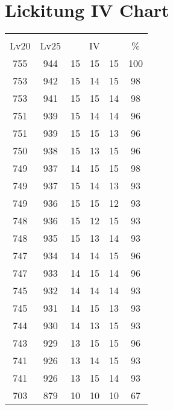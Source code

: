 \documentclass{article}%
\begin{document}
%
\normalsize%
\section{Lickitung IV Chart}%
\label{sec:Lickitung IV Chart}%
\renewcommand{\arraystretch}{1.5}%
\begin{tabular}{|c|c|c|c|c|c|}%
\hline%
\multicolumn{6}{|c|}{\textcolor{white}{ 
\linebreak{Lickitung}
}%
\cellcolor{black}}\\%
\multicolumn{1}{|c}{Lv20}&\multicolumn{1}{c|}{Lv25}&\multicolumn{3}{c|}{IV}&\multicolumn{1}{|c|}{\%}\\%
\hline%
\rowcolor{color100}%
755&944&15&15&15&100\\%
\hline%
\rowcolor{color98}%
753&942&15&14&15&98\\%
\hline%
\rowcolor{color98}%
753&941&15&15&14&98\\%
\hline%
\rowcolor{color96}%
751&939&15&14&14&96\\%
\hline%
\rowcolor{color96}%
751&939&15&15&13&96\\%
\hline%
\rowcolor{color96}%
750&938&15&13&15&96\\%
\hline%
\rowcolor{color98}%
749&937&14&15&15&98\\%
\hline%
\rowcolor{color93}%
749&937&15&14&13&93\\%
\hline%
\rowcolor{color93}%
749&936&15&15&12&93\\%
\hline%
\rowcolor{color93}%
748&936&15&12&15&93\\%
\hline%
\rowcolor{color93}%
748&935&15&13&14&93\\%
\hline%
\rowcolor{color96}%
747&934&14&14&15&96\\%
\hline%
\rowcolor{color96}%
747&933&14&15&14&96\\%
\hline%
\rowcolor{color93}%
745&932&14&14&14&93\\%
\hline%
\rowcolor{color93}%
745&931&14&15&13&93\\%
\hline%
\rowcolor{color93}%
744&930&14&13&15&93\\%
\hline%
\rowcolor{color96}%
743&929&13&15&15&96\\%
\hline%
\rowcolor{color93}%
741&926&13&14&15&93\\%
\hline%
\rowcolor{color93}%
741&926&13&15&14&93\\%
\hline%
\rowcolor{color91}%
703&879&10&10&10&67\\%
\end{tabular}

%
\end{document}
